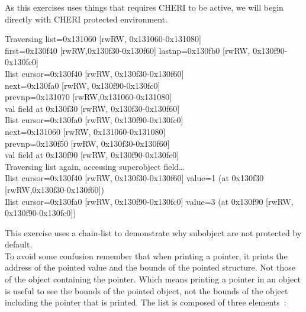 \documentclass[a4paper, 11pt]{article}
\begin{document}
As this exercises uses things that requires CHERI to be active, we will begin directly with CHERI protected environment.
\begin{tcolorbox}[colback=gray!5!white, colframe=blue!75!black, title=Output On an environment protected by CHERI]
	Traversing list=0x131060 [rwRW, 0x131060-0x131080] \\
	first=0x130f40 [rwRW,0x130f30-0x130f60] lastnp=0x130fb0 [rwRW, 0x130f90-0x130fc0]\\
	Ilist cursor=0x130f40 [rwRW, 0x130f30-0x130f60]\\
	next=0x130fa0 [rwRW, 0x130f90-0x130fc0]\\
	prevnp=0x131070 [rwRW,0x131060-0x131080]\\
	val field at 0x130f30 [rwRW, 0x130f30-0x130f60]\\
	Ilist cursor=0x130fa0 [rwRW, 0x130f90-0x130fc0]\\
	next=0x131060 [rwRW, 0x131060-0x131080]\\
	prevnp=0x130f50 [rwRW, 0x130f30-0x130f60]\\
	val field at 0x130f90 [rwRW, 0x130f90-0x130fc0]\\
	Traversing list again, accessing superobject field\dots\\
	Ilist cursor=0x130f40 [rwRW, 0x130f30-0x130f60] value=1 (at 0x130f30 [rwRW,0x130f30-0x130f60])\\
	Ilist cursor=0x130fa0 [rwRW, 0x130f90-0x130fc0] value=3 (at 0x130f90 [rwRW, 0x130f90-0x130fc0])
\end{tcolorbox}

This exercise uses a chain-list to demonstrate why subobject are not protected by default.\\
To avoid some confusion remember that when printing a pointer, it prints the address of the pointed value and the bounds of the pointed structure. Not those of the object containing the pointer. Which means printing a pointer in an object is useful to see the bounds of the pointed object, not the bounds of the object including the pointer that is printed.
The list is composed of three elements :\\
\end{document}
